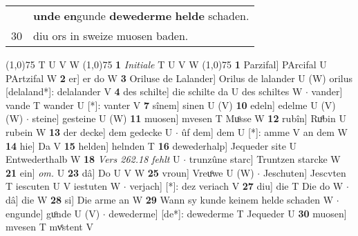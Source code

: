 \documentclass[8pt,a4paper,notitlepage]{article}
\begin{document}
\begin{table}[ht]
\begin{minipage}[t]{0.5\linewidth}
\begin{tabular}{rl}
 & \textbf{unde} \textbf{en}gunde \textbf{dewederme} \textbf{helde} schaden.\\ 
30 & diu ors in sweize muosen baden.\\ 
\end{tabular}
\scriptsize
\line(1,0){75} \newline
T U V W \newline
\line(1,0){75} \newline
\textbf{1} \textit{Initiale} T U V W  \newline
\line(1,0){75} \newline
\textbf{1} Parzifal] PArcifal U PArtzifal W \textbf{2} er] er do W \textbf{3} Oriluse de Lalander] Orilus de lalander U (W) orilus [delaland*]: delalander  V \textbf{4} des schilte] die schilte da U des schiltes W  $\cdot$ vander] vande T wander U [*]: vanter V \textbf{7} sînem] sinen U (V) \textbf{10} edeln] edelme U (V) (W)  $\cdot$ steine] gesteine U (W) \textbf{11} muosen] mvesen T Muͦsse W \textbf{12} rubîn] Ruͦbin U rubein W \textbf{13} der decke] dem gedecke U  $\cdot$ ûf dem] dem U [*]: amme V an dem W \textbf{14} hie] Da V \textbf{15} helden] helnden T \textbf{16} dewederhalp] Jequeder site U Entwederthalb W \textbf{18} \textit{Vers 262.18 fehlt} U   $\cdot$ trunzûne starc] Truntzen starcke W \textbf{21} ein] \textit{om.} U \textbf{23} dâ] Do U V W \textbf{25} vroun] Vreuͦwe U (W)  $\cdot$ Jeschuten] Jescvten T iescuten U V iestuten W  $\cdot$ verjach] [*]: dez veriach V \textbf{27} diu] die T Die do W  $\cdot$ dâ] die W \textbf{28} si] Die arme an W \textbf{29} Wann sy kunde keinem helde schaden W  $\cdot$ engunde] guͦnde U (V)  $\cdot$ dewederme] [de*]: dewederme T Jequeder U \textbf{30} muosen] mvesen T mvͤstent V \newline
\end{minipage}
\end{table}
\end{document}
